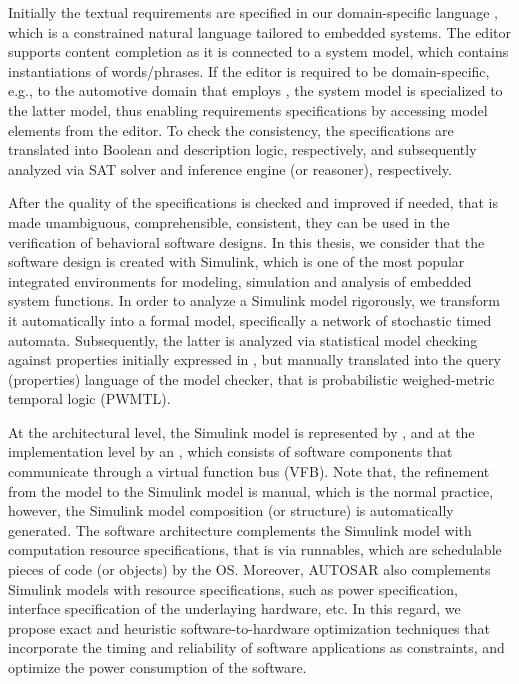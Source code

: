 Initially the textual requirements are specified in our domain-specific language \resa, which is a constrained natural language tailored to embedded systems. The \resa{} editor supports content completion as it is connected to a system model, which contains instantiations of words/phrases. If the \resa{} editor is required to be domain-specific, e.g., to the automotive domain that employs \eastadl, the system model is specialized to the latter model, thus enabling requirements specifications by accessing \eastadl{} model elements from the editor. To check the consistency, the \resa{} specifications are translated into Boolean and description logic, respectively, and subsequently analyzed via SAT solver and inference engine (or reasoner), respectively.

After the quality of the specifications is checked and improved if needed, that is made unambiguous, comprehensible, consistent, they can be used in the verification of behavioral software designs. In this thesis, we consider that the software design is created with Simulink, which is one of the most popular integrated environments for modeling, simulation and analysis of embedded system functions. In order to analyze a Simulink model rigorously, we transform it automatically into a formal model, specifically a network of stochastic timed automata. Subsequently, the latter is analyzed via statistical model checking against properties initially expressed in \resa, but manually translated into the query (properties) language of the model checker, that is probabilistic weighed-metric temporal logic (PWMTL).

At the architectural level, the Simulink model is represented by \eastadl{}, and at the implementation level by an \autosar{}, which consists of software components that communicate through a virtual function bus (VFB).  Note that, the refinement from the \autosar{} model to the Simulink model is manual, which is the normal practice, however, the Simulink model composition (or structure) is automatically generated. The software architecture complements the Simulink model with computation resource specifications, that is via runnables, which are schedulable pieces of code (or objects) by the \autosar{} OS. Moreover, AUTOSAR also complements Simulink models with resource specifications, such as power specification, interface specification of the underlaying hardware, etc. In this regard, we propose exact and heuristic software-to-hardware optimization techniques that incorporate the timing and reliability of software applications as constraints, and optimize the power consumption of the software.

